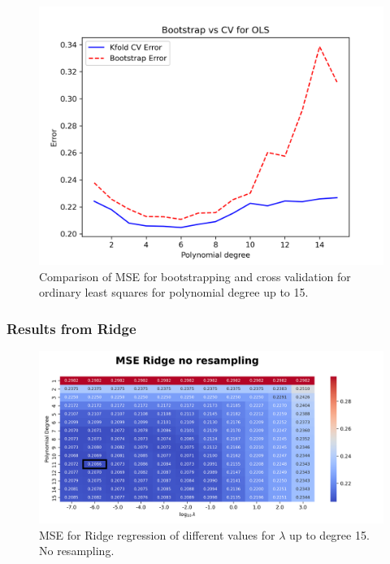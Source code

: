\documentclass{article}
\begin{document}
\begin{figure}[htbp]
    \centering
    \includegraphics[width=\textwidth*2/3]{Project1/figures/Franke/Bias_vs_Var_OLS_15.png}
    \caption{Comparison of MSE for bootstrapping and cross validation for ordinary least squares for polynomial degree up to 15.}
    \label{fig:BvsCV}
\end{figure}

\newpage
\subsubsection{Results from Ridge}
\begin{figure}[htbp]
    \centering
    \includegraphics[width=\textwidth]{Project1/figures/Franke/Heatmap_MSE_Ridge_no_resampling.png}
    \caption{MSE for Ridge regression of different values for $\lambda$ up to degree 15. No resampling.}
    \label{fig:RidgeNoResamp}
\end{figure}
\end{document}
